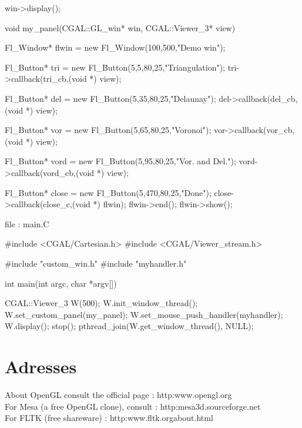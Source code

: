 \begin{cprog}
{  win->display();
}




void my_panel(CGAL::GL_win* win, CGAL::Viewer_3* view)
{


 Fl_Window* flwin = new Fl_Window(100,500,"Demo win");

 Fl_Button* tri = new Fl_Button(5,5,80,25,"Triangulation");
 tri->callback(tri_cb,(void *) view);

 Fl_Button* del = new Fl_Button(5,35,80,25,"Delaunay");
 del->callback(del_cb,(void *) view);

 
 Fl_Button* vor = new Fl_Button(5,65,80,25,"Voronoi");
 vor->callback(vor_cb,(void *) view);

 Fl_Button* vord = new Fl_Button(5,95,80,25,"Vor. and Del.");
 vord->callback(vord_cb,(void *) view);


 Fl_Button* close = new Fl_Button(5,470,80,25,"Done");
 close->callback(close_c,(void *) flwin);
    flwin->end();
    flwin->show();

}

\end{cprog}
file : main.C
\begin{cprog}
#include <CGAL/Cartesian.h>
#include <CGAL/Viewer_stream.h>

#include "custom_win.h"
#include "myhandler.h"

int main(int argc, char *argv[]) 
{

  CGAL::Viewer_3 W(500);
  W.init_window_thread();
  W.set_custom_panel(my_panel);
  W.set_mouse_push_handler(myhandler);
  W.display();
  stop();
  pthread_join(W.get_window_thread(), NULL);
}

\end{cprog}

\section{Adresses}

About OpenGL consult the official page : http:\/\/www.opengl.org\/ \\
For Mesa (a free OpenGL clone), consult :
http:\/\/mesa3d.sourceforge.net\/ \\
For FLTK (free shareware) : http:\/\/www.fltk.org\/about.html


